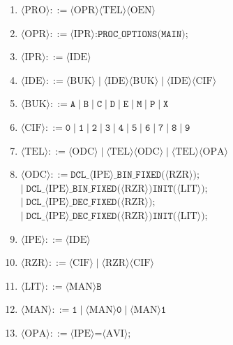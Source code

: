 \documentclass[a4paper,14pt]{extarticle}
\begin{document}
\begin{enumerate}
  \item $\langle\text{PRO}\rangle ::= \langle\text{OPR}\rangle\langle\text{TEL}\rangle\langle\text{OEN}\rangle$
  \item $\langle\text{OPR}\rangle ::= \langle\text{IPR}\rangle\texttt{:PROC\_OPTIONS(MAIN);}$
  \item $\langle\text{IPR}\rangle ::= \langle\text{IDE}\rangle$
  \item $\langle\text{IDE}\rangle ::= \langle\text{BUK}\rangle \mid \langle\text{IDE}\rangle\langle\text{BUK}\rangle \mid \langle\text{IDE}\rangle\langle\text{CIF}\rangle$
  \item $\langle\text{BUK}\rangle ::= \texttt{A} \mid \texttt{B} \mid \texttt{C} \mid \texttt{D} \mid \texttt{E} \mid \texttt{M} \mid \texttt{P} \mid \texttt{X}$
  \item $\langle\text{CIF}\rangle ::= \texttt{0} \mid \texttt{1} \mid \texttt{2} \mid \texttt{3} \mid \texttt{4} \mid \texttt{5} \mid \texttt{6} \mid \texttt{7} \mid \texttt{8} \mid \texttt{9}$
  \item $\langle\text{TEL}\rangle ::= \langle\text{ODC}\rangle \mid \langle\text{TEL}\rangle\langle\text{ODC}\rangle \mid \langle\text{TEL}\rangle\langle\text{OPA}\rangle$
  \item $\langle\text{ODC}\rangle ::= \texttt{DCL\_}\langle\text{IPE}\rangle\texttt{\_BIN\_FIXED(}\langle\text{RZR}\rangle\texttt{);}$\\
        $\mid\; \texttt{DCL\_}\langle\text{IPE}\rangle\texttt{\_BIN\_FIXED(}\langle\text{RZR}\rangle\texttt{)INIT(}\langle\text{LIT}\rangle\texttt{);}$\\
        \textit{$\mid\; \texttt{DCL\_}\langle\text{IPE}\rangle\texttt{\_DEC\_FIXED(}\langle\text{RZR}\rangle\texttt{);}$}\\
        \textit{$\mid\; \texttt{DCL\_}\langle\text{IPE}\rangle\texttt{\_DEC\_FIXED(}\langle\text{RZR}\rangle\texttt{)INIT(}\langle\text{LIT}\rangle\texttt{);}$}
  \item $\langle\text{IPE}\rangle ::= \langle\text{IDE}\rangle$
  \item $\langle\text{RZR}\rangle ::= \langle\text{CIF}\rangle \mid \langle\text{RZR}\rangle\langle\text{CIF}\rangle$
  \item $\langle\text{LIT}\rangle ::= \langle\text{MAN}\rangle\texttt{B}$
  \item $\langle\text{MAN}\rangle ::= \texttt{1} \mid \langle\text{MAN}\rangle\texttt{0} \mid \langle\text{MAN}\rangle\texttt{1}$
  \item $\langle\text{OPA}\rangle ::= \langle\text{IPE}\rangle\texttt{=}\langle\text{AVI}\rangle\texttt{;}$

\end{enumerate}
\end{document}
